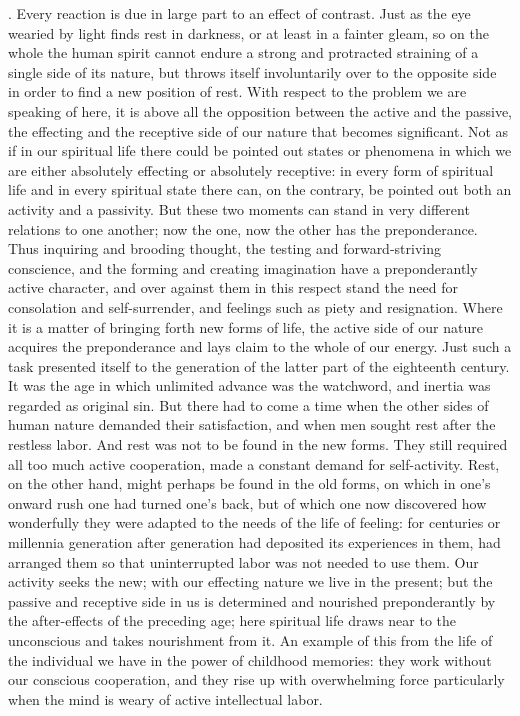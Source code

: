 \documentclass[12pt,a4paper]{article}
\begin{document}
\medskip
{}. Every reaction is due in large part to an effect of contrast.
Just as the eye wearied by light finds rest in darkness, or at least in a
fainter gleam, so on the whole the human spirit cannot endure a strong and
protracted straining of a single side of its nature, but throws itself
involuntarily over to the opposite side in order to find a new position of
rest. With respect to the problem we are speaking of here, it is above all the
opposition between the active and the passive, the effecting and the receptive
side of our nature that becomes significant. Not as if in our spiritual life
there could be pointed out states or phenomena in which we are either
absolutely effecting or absolutely receptive: in every form of spiritual life
and in every spiritual state there can, on the contrary, be pointed out both an
activity and a passivity. But these two moments can stand in very different
relations to one another; now the one, now the other has the preponderance.
Thus inquiring and brooding thought, the testing and forward-striving
conscience, and the forming and creating imagination have a preponderantly
active character, and over against them in this respect stand the need for
consolation and self-surrender, and feelings such as piety and resignation.
Where it is a matter of bringing forth new forms of life, the active side of
our nature acquires the preponderance and lays claim to the whole of our
energy. Just such a task presented itself to the generation of the latter part
of the eighteenth century. It was the age in which unlimited advance was the
watchword, and inertia was regarded as original sin. But there had to come a
time when the other sides of human nature demanded their satisfaction, and
when men sought rest after the restless labor. And rest was not to be found in
the new forms. They still required all too much active cooperation, made a
constant demand for self-activity. Rest, on the other hand, might perhaps be
found in the old forms, on which in one's onward rush one had turned one's
back, but of which one now discovered how wonderfully they were adapted to the
needs of the life of feeling: for centuries or millennia generation after
generation had deposited its experiences in them, had arranged them so that
uninterrupted labor was not needed to use them. Our activity seeks the new;
with our effecting nature we live in the present; but the passive and
receptive side in us is determined and nourished preponderantly by the
after-effects of the preceding age; here spiritual life draws near to the
unconscious and takes nourishment from it. An example of this from the life of
the individual we have in the power of childhood memories: they work without
our conscious cooperation, and they rise up with overwhelming force
particularly when the mind is weary of active intellectual labor.
\end{document}
